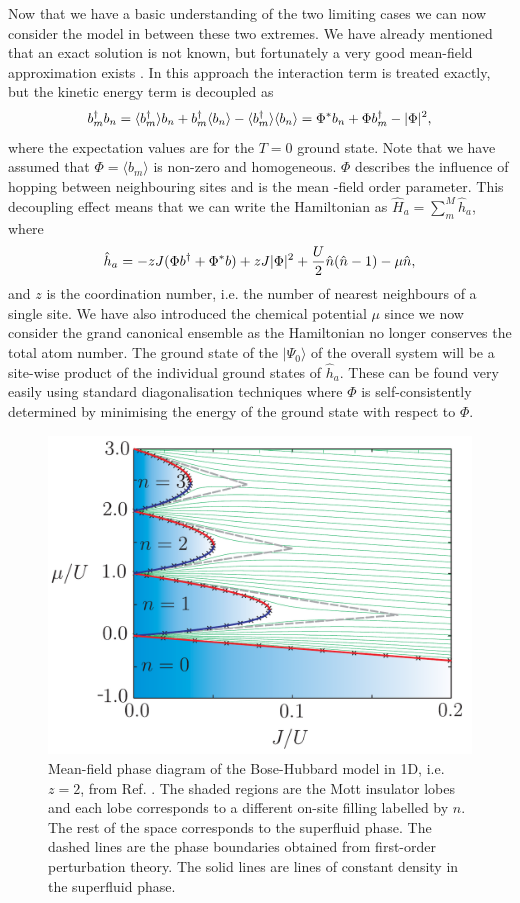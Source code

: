 Now that we have a basic understanding of the two limiting cases we
can now consider the model in between these two extremes. We have
already mentioned that an exact solution is not known, but fortunately
a very good mean-field approximation exists \cite{fisher1989}. In this
approach the interaction term is treated exactly, but the kinetic
energy term is decoupled as
\begin{equation}
  b^\dagger_m b_n = \langle b^\dagger_m \rangle b_n + b^\dagger_m \langle b_n \rangle -
  \langle b^\dagger_m \rangle \langle b_n \rangle = \Phi^* b_n + \Phi b^\dagger_m
  - | \Phi |^2,
\end{equation}
where the expectation values are for the $T = 0$ ground state. Note
that we have assumed that $\Phi = \langle b_m \rangle $ is non-zero
and homogeneous. $\Phi$ describes the influence of hopping between
neighbouring sites and is the mean -field order parameter. This
decoupling effect means that we can write the Hamiltonian as $\hat{H}_a
= \sum_m^M \hat{h}_a$, where
\begin{equation}
  \hat{h}_a = -z J ( \Phi b^\dagger + \Phi^* b) + z J | \Phi |^2 + \frac{U}{2}
  \hat{n} (\hat{n} - 1) - \mu \hat{n},
\end{equation}
and $z$ is the coordination number, i.e. the number of nearest
neighbours of a single site. We have also introduced the chemical
potential $\mu$ since we now consider the grand canonical ensemble as
the Hamiltonian no longer conserves the total atom number. The ground
state of the $| \Psi_0 \rangle$ of the overall system will be a
site-wise product of the individual ground states of
$\hat{h}_a$. These can be found very easily using standard
diagonalisation techniques where $\Phi$ is self-consistently
determined by minimising the energy of the ground state with respect
to $\Phi$.

\begin{figure}
  \centering
  \includegraphics[width=0.8\linewidth]{BHPhase}
  \caption[Mean-Field Bose-Hubbard Phase Diagram]{Mean-field phase
    diagram of the Bose-Hubbard model in 1D, i.e.~ $z = 2$, from
    Ref. \cite{StephenThesis}. The shaded regions are the Mott
    insulator lobes and each lobe corresponds to a different on-site
    filling labelled by $n$. The rest of the space corresponds to the
    superfluid phase. The dashed lines are the phase boundaries
    obtained from first-order perturbation theory. The solid lines are
    lines of constant density in the superfluid
    phase. \label{fig:BHPhase}}
\end{figure}

